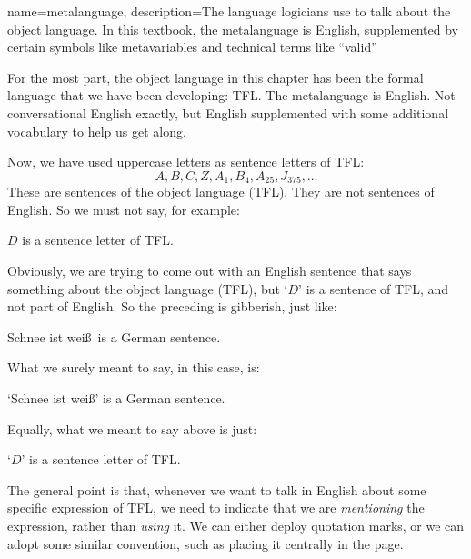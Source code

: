 {
name=metalanguage,
description={The language logicians use to talk about the object language. In this textbook, the metalanguage is English, supplemented by certain symbols like metavariables and technical terms like ``valid''}
}

For the most part, the object language in this chapter has been the formal language that we have been developing: TFL. The metalanguage is English. Not conversational English exactly, but English supplemented with some additional vocabulary to help us get along.

Now, we have used uppercase letters as sentence letters of TFL:
	$$A, B, C, Z, A_1, B_4, A_{25}, J_{375},\ldots$$
These are sentences of the object language (TFL). They are not sentences of English. So we must not say, for example:
	\begin{ebullet}
		\item $D$ is a sentence letter of TFL.
	\end{ebullet}
Obviously, we are trying to come out with an English sentence that says something about the object language (TFL), but `$D$' is a sentence of TFL, and not part of English. So the preceding is gibberish, just like:
	\begin{ebullet}
		\item Schnee ist wei\ss\ is a German sentence.
	\end{ebullet}
What we surely meant to say, in this case, is:
	\begin{ebullet}
		\item `Schnee ist wei\ss' is a German sentence.
	\end{ebullet}
Equally, what we meant to say above is just:
	\begin{ebullet}
		\item `$D$' is a sentence letter of TFL.
	\end{ebullet}
The general point is that, whenever we want to talk in English about some specific expression of TFL, we need to indicate that we are \emph{mentioning} the expression, rather than \emph{using} it. We can either deploy quotation marks, or we can adopt some similar convention, such as  placing it centrally in the page.


